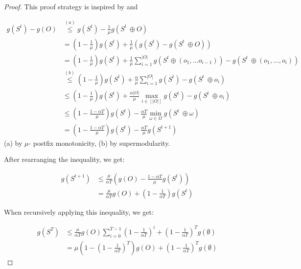 \documentclass{article} %
\begin{document}
\begin{proof}

This proof strategy is inspired by \citet{streeter2008online} and \citet{liberty2017greedy}

\begin{align*}
    g(S^t) -g(O) &\overset{(a)}{\leq} g(S^t) - \frac{1}{\mu}g(S^t\ \oplus O) \\
    &= \left(1 - \frac{1}{\mu}\right)g(S^t) + \frac{1}{\mu}\left(g(S^t) - g(S^t\ \oplus O)\right) \\
    &=\left(1 - \frac{1}{\mu}\right)g(S^t) + \frac{1}{\mu}\sum_{i = 1}^{|O|} g(S^t \oplus \left(o_1, \dots o_{i - 1}\right)) -g(S^t\ \oplus \left(o_1, \dots, o_{i}\right))\\
    &\overset{(b)}{\leq} \left(1 - \frac{1}{\mu}\right)g(S^t) + \frac{\alpha}{\mu}\sum_{i = 1}^{|O|} g(S^t) -g(S^t\ \oplus  o_{i}) \\
    &\leq \left(1 - \frac{1}{\mu}\right)g(S^t) + \frac{\alpha|O|}{\mu}\max_{i \in [|O|]} g(S^t) -g(S^t\ \oplus  o_{i}) \\
    &\leq  \left(1 - \frac{1 - \alpha T}{\mu}\right)g(S^t) -  \frac{\alpha T}{\mu}\min_{\omega \in \Omega} g(S^t\ \oplus  \omega) \\
    &=  \left(1 - \frac{1 - \alpha T}{\mu}\right)g(S^t) -  \frac{\alpha T}{\mu}g(S^{t + 1})
\end{align*}
(a) by $\mu$- postfix monotonicity, (b) by supermodularity. 

After rearranging the inequality, we get:

\begin{align*}
    g(S^{t + 1}) &\leq \frac{\mu}{\alpha T}\left(g(O) -  \frac{1 - \alpha T}{\mu}g(S^t)\right) \\
    &= \frac{\mu}{\alpha T}g(O) + \left(1 - \frac{1}{\alpha T}\right)g(S^t)
\end{align*}

When recursively applying this inequality, we get:

\begin{align*}
     g(S^{T}) &\leq \frac{\mu}{\alpha T}g(O)\sum_{i = 0}^{T - 1}\left(1 - \frac{1}{\alpha T}\right)^i + \left(1 - \frac{1}{\alpha T}\right)^Tg(\emptyset) \\
     &= \mu \left(1 - \left(1 - \frac{1}{\alpha T}\right)^T\right)g(O) + \left(1 - \frac{1}{\alpha T}\right)^Tg(\emptyset)
\end{align*}
\end{proof}
\end{document}
